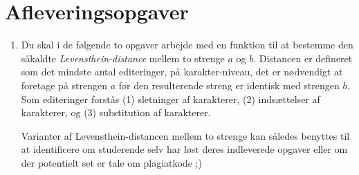 \documentclass[a4paper,12pt]{article}
\begin{document}
\section*{Afleveringsopgaver}
\begin{enumerate}[label=8i.\arabic*,start=0]



\begin{enumerate}[label=8i.\arabic*,start=3]
\item Du skal i de følgende to opgaver arbejde med en funktion til at
  bestemme den såkaldte \emph{Levensthein-distance} mellem to strenge
  $a$ og $b$. Distancen er defineret som det mindste antal
  editeringer, på karakter-niveau, det er nødvendigt at foretage på
  strengen $a$ før den resulterende streng er identisk med strengen
  $b$. Som editeringer forstås (1) sletninger af karakterer, (2)
  indsættelser af karakterer, og (3) substitution af
  karakterer.

  Varianter af Levensthein-distancen mellem to strenge kan
  således benyttes til at identificere om studerende selv har løst
  deres indleverede opgaver eller om der potentielt set er tale om
  plagiatkode ;)


\end{enumerate}
\end{enumerate}
\end{document}
